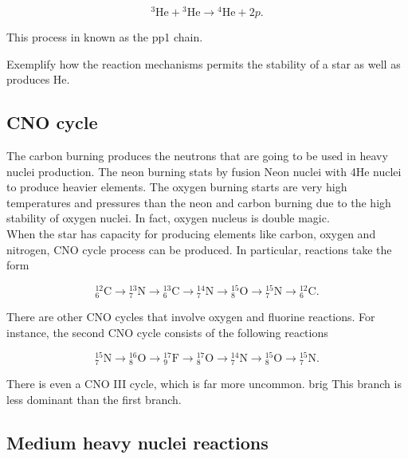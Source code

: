 \documentclass[openany]{book}
\begin{document}
\begin{equation}
	{}^{3}\mathrm{He} +  {}^{3}\mathrm{He}  \rightarrow {}^{4}\mathrm{He} + 2p.
\end{equation}

This process in known as the pp1 chain.

Exemplify how the reaction mechanisms permits the stability of a star as well as produces He. \\

\subsection{CNO cycle}

The carbon burning produces the neutrons that are going to be used in heavy nuclei production. 
The neon burning stats by fusion Neon nuclei with 4He nuclei to produce heavier elements.
The oxygen burning starts are very high temperatures and pressures than the neon and carbon burning due to the high stability of oxygen nuclei. In fact, oxygen nucleus is double magic. \\

When the star has capacity for producing elements like carbon, oxygen and nitrogen,  CNO cycle process can be produced. In particular, reactions take the form 

\begin{equation}
	\mathrm{{}_{6}^{12}C  \rightarrow {}^{13}_{7}N  \rightarrow {}^{13}_{6}C  \rightarrow {}^{14}_{7}N  \rightarrow {}^{15}_{8}O  \rightarrow {}^{15}_{7}N \rightarrow {}^{12}_{6}C  }.
\end{equation}

There are other CNO cycles that involve oxygen and fluorine reactions. For instance, the second CNO cycle consists of the following reactions

\begin{equation}
	\mathrm{{}_{7}^{15}N  \rightarrow {}^{16}_{8}O  \rightarrow {}^{17}_{9}F  \rightarrow {}^{17}_{8}O  \rightarrow {}^{14}_{7}N  \rightarrow {}^{15}_{8}O \rightarrow {}^{15}_{7}N  }.
\end{equation}

There is even a CNO III cycle, which is far more uncommon. 
brig
This branch is less dominant than the first branch.

\subsection{Medium heavy nuclei reactions}
\end{document}
